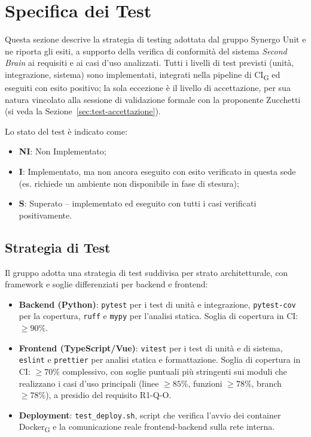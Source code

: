 
\section{Specifica dei Test}
Questa sezione descrive la strategia di testing adottata dal gruppo Synergo Unit e ne riporta gli esiti, a supporto della verifica di conformità del sistema \textit{Second Brain} ai requisiti e ai casi d'uso analizzati. Tutti i livelli di test previsti (unità, integrazione, sistema) sono implementati, integrati nella pipeline di CI\textsubscript{G} ed eseguiti con esito positivo; la sola eccezione è il livello di accettazione, per sua natura vincolato alla sessione di validazione formale con la proponente Zucchetti (si veda la Sezione~\ref{sec:test-accettazione}).

Lo stato del test è indicato come:
\begin{itemize}
    \item \textbf{NI}: Non Implementato;
    \item \textbf{I}: Implementato, ma non ancora eseguito con esito verificato in questa sede (es. richiede un ambiente non disponibile in fase di stesura);
    \item \textbf{S}: Superato -- implementato ed eseguito con tutti i casi verificati positivamente.
\end{itemize}

\subsection{Strategia di Test}
Il gruppo adotta una strategia di test suddivisa per strato architetturale, con framework e soglie differenziati per backend e frontend:
\begin{itemize}
    \item \textbf{Backend (Python)}: \texttt{pytest} per i test di unità e integrazione, \texttt{pytest-cov} per la copertura, \texttt{ruff} e \texttt{mypy} per l'analisi statica. Soglia di copertura in CI: $\geq 90\%$.
    \item \textbf{Frontend (TypeScript/Vue)}: \texttt{vitest} per i test di unità e di sistema, \texttt{eslint} e \texttt{prettier} per analisi statica e formattazione. Soglia di copertura in CI: $\geq 70\%$ complessivo, con soglie puntuali più stringenti sui moduli che realizzano i casi d'uso principali (linee $\geq 85\%$, funzioni $\geq 78\%$, branch $\geq 78\%$), a presidio del requisito R1-Q-O.
    \item \textbf{Deployment}: \texttt{test\_deploy.sh}, script che verifica l'avvio dei container Docker\textsubscript{G} e la comunicazione reale frontend-backend sulla rete interna.
\end{itemize}

